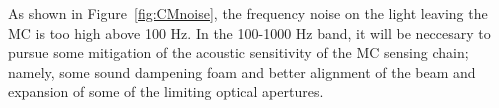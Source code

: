 As shown in Figure~\ref{fig:CMnoise}, the frequency noise on the light
leaving the MC is too high above 100 Hz. In the 100-1000 Hz band, it
will be neccesary to pursue some mitigation of the acoustic sensitivity
of the MC sensing chain; namely, some sound dampening foam and better
alignment of the beam and expansion of some of the limiting optical apertures.













